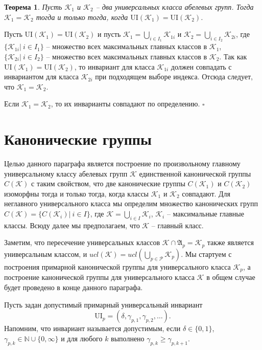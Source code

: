 \documentclass[a4paper,11pt,twoside]{article}
\newtheorem{theorem}{Теорема}[section]
\def\proof{{\noindent{\bf Доказательство.}} }
\def\A{{\mathfrak{A}}}
\def\K{{\mathcal{K}}}
\def\P{{\mathcal{P}}}
\def\N{{\mathbb{N}}}
\def\ui{{\mathrm{UI}}}
\begin{document}
\begin{theorem}\label{th:UnivEquivAnyClasses}
Пусть $\K_1$ и $\K_2$ -- два универсальных класса абелевых групп. Тогда $\K_1 = \K_2$ тогда и только тогда, когда $\ui(\K_1) = \ui(\K_2)$.
\end{theorem}

\proof Пусть $\ui(\K_1) = \ui(\K_2)$ и пусть $\K_1 = \bigcup\limits_{i \in I_1} \K_{1i}$ и $\K_2 = \bigcup\limits_{i \in I_2} \K_{2i}$, где $\{\K_{1i} | \ i \in I_1\}$ -- множество всех максимальных главных классов в $\K_1$, $\{\K_{2i} | \ i \in I_2\}$ -- множество всех максимальных главных классов в $\K_2$. Так как $\ui(\K_1) = \ui(\K_2)$, то инвариант для класса $\K_{1i}$ должен совпадать с инвариантом для класса $\K_{2i}$ при подходящем выборе индекса. Отсюда следует, что $\K_1 = \K_2$. 

Если $\K_1 = \K_2$, то их инварианты совпадают по определению. $\square$


\section{Канонические группы}\label{sec:CannonicalGroups}

Целью данного параграфа является построение по произвольному главному универсальному классу абелевых групп $\K$ единственной канонической группы $C(\K)$ с таким свойством, что две канонические группы $C(\K_1)$ и $C(\K_2)$ изоморфны тогда и только тогда, когда классы $\K_1$ и $\K_2$ совпадают. Для неглавного универсального класса мы определим множество канонических групп $C(\K) = \{C(\K_i) | \ i \in I\}$, где $\K = \bigcup\limits_{i \in I} \K_i$, $\K_i$ -- максимальные главные классы. Всюду далее мы предполагаем, что $\K$ -- главный класс. 

Заметим, что пересечение универсальных классов $\K \cap \A_p = \K_p$ также является универсальным классом, и $ucl(\K) = ucl(\bigcup\limits_{p \in \P} \K_p)$. Мы стартуем с построения примарной канонической группы для универсального класса $\K_p$, а построение канонической группы для универсального класса $\K$ в общем случае будет проведено в конце данного параграфа.

Пусть задан допустимый примарный универсальный инвариант 
$$\ui_p = (\delta, \gamma_{p,1}, \gamma_{p,2}, \ldots).$$
Напомним, что инвариант называется допустимым, если $\delta \in \{0,1\}$, $\gamma_{p,k} \in \N \cup \{0, \infty\}$ и для любого $k$ выполнено $\gamma_{p,k} \geq \gamma_{p, k+1}$.
\end{document}

